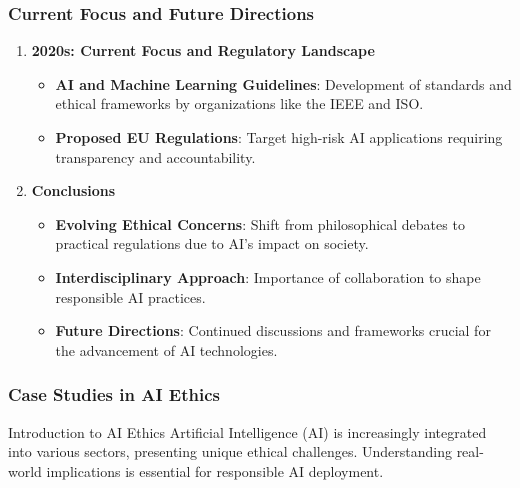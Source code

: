 \documentclass{beamer}
\begin{document}
\begin{frame}[fragile]
    \frametitle{Current Focus and Future Directions}
    \begin{enumerate}
        \item \textbf{2020s: Current Focus and Regulatory Landscape}
        \begin{itemize}
            \item \textbf{AI and Machine Learning Guidelines}: Development of standards and ethical frameworks by organizations like the IEEE and ISO.
            \item \textbf{Proposed EU Regulations}: Target high-risk AI applications requiring transparency and accountability.
        \end{itemize}
        
        \item \textbf{Conclusions}
        \begin{itemize}
            \item \textbf{Evolving Ethical Concerns}: Shift from philosophical debates to practical regulations due to AI's impact on society.
            \item \textbf{Interdisciplinary Approach}: Importance of collaboration to shape responsible AI practices.
            \item \textbf{Future Directions}: Continued discussions and frameworks crucial for the advancement of AI technologies.
        \end{itemize}
    \end{enumerate}
\end{frame}

\begin{frame}[fragile]
    \frametitle{Case Studies in AI Ethics}
    \begin{block}{Introduction to AI Ethics}
        Artificial Intelligence (AI) is increasingly integrated into various sectors, presenting unique ethical challenges. Understanding real-world implications is essential for responsible AI deployment.
    \end{block}
\end{frame}
\end{document}
